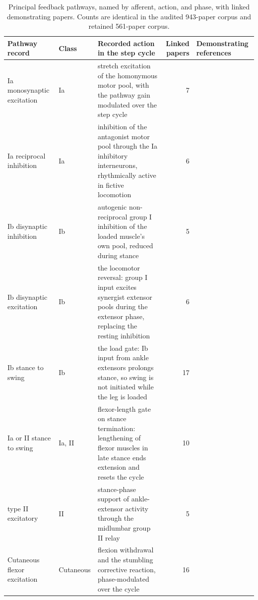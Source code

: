 \begin{table}
\caption{Principal feedback pathways, named by afferent, action, and phase, with linked demonstrating papers. Counts are identical in the audited 943-paper corpus and retained 561-paper corpus.}
\label{tab:sadb_pathways}
\fontsize{10pt}{12pt}\selectfont
\begin{tabularx}{\textheight}{@{}llXrp{0.26\textheight}@{}}
\toprule
\textbf{Pathway record} & \textbf{Class} & \textbf{Recorded action in the step cycle} & \textbf{Linked papers} & \textbf{Demonstrating references} \\
\midrule
Ia monosynaptic excitation & Ia & stretch excitation of the homonymous motor pool, with the pathway gain modulated over the step cycle & 7 & \citep{eccles_integrative_1958, capaday_amplitude_1986} \\
Ia reciprocal inhibition & Ia & inhibition of the antagonist motor pool through the Ia inhibitory interneurons, rhythmically active in fictive locomotion & 6 & \citep{jankowska_effect_1967, pratt_ia_1987} \\
Ib disynaptic inhibition & Ib & autogenic non-reciprocal group I inhibition of the loaded muscle's own pool, reduced during stance & 5 & \citep{jankowska_common_1981, stephens_short_1996} \\
Ib disynaptic excitation & Ib & the locomotor reversal: group I input excites synergist extensor pools during the extensor phase, replacing the resting inhibition & 6 & \citep{mccrea_disynaptic_1995, pearson_enhancement_1998} \\
Ib stance to swing & Ib & the load gate: Ib input from ankle extensors prolongs stance, so swing is not initiated while the leg is loaded & 17 & \citep{dietz_significance_2000, dominguez_candidate_2020} \\
Ia or II stance to swing & Ia, II & flexor-length gate on stance termination: lengthening of flexor muscles in late stance ends extension and resets the cycle & 10 & \citep{hiebert_contribution_1996, akay_degradation_2014} \\
type II excitatory & II & stance-phase support of ankle-extensor activity through the midlumbar group II relay & 5 & \citep{edgley_interneuronal_1987, mazzaro_afferent_2006} \\
Cutaneous flexor excitation & Cutaneous & flexion withdrawal and the stumbling corrective reaction, phase-modulated over the cycle & 16 & \citep{sherrington_flexion_1910, forssberg_stumbling_1979} \\
\bottomrule
\end{tabularx}
\end{table}
